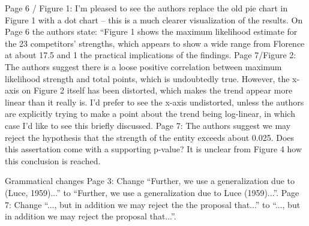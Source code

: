 \documentclass[12pt]{article}
\begin{document}
Page 6 / Figure 1: I’m pleased to see the authors replace the old pie chart in Figure 1 with a dot chart
– this is a much clearer visualization of the results. On Page 6 the authors state: “Figure 1 shows the
maximum likelihood estimate for the 23 competitors’ strengths, which appears to show a wide range
from Florence at about 17.5%
and 1%
the practical implications of the findings.
Page 7/Figure 2: The authors suggest there is a loose positive correlation between maximum likelihood
strength and total points, which is undoubtedly true. However, the x-axis on Figure 2 itself has been
distorted, which makes the trend appear more linear than it really is. I’d prefer to see the x-axis
undistorted, unless the authors are explicitly trying to make a point about the trend being log-linear,
in which case I’d like to see this briefly discussed.
Page 7: The authors suggest we may reject the hypothesis that the strength of the entity exceeds
about 0.025. Does this assertation come with a supporting p-value? It is unclear from Figure 4 how
this conclusion is reached.

Grammatical changes
Page 3: Change “Further, we use a generalization due to (Luce, 1959)...” to “Further, we use a
generalization due to Luce (1959)...”.
Page 7: Change “..., but in addition we may reject the the proposal that...” to “..., but in addition we
may reject the proposal that...”.
\end{document}
